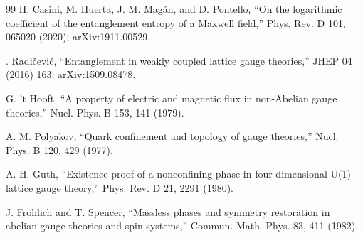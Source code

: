 \documentclass[11pt]{article}
\theoremstyle{remark}
\theoremstyle{plain}
\begin{document}
\begin{thebibliography}{99}
 H. Casini, M. Huerta, J. M. Mag\'an, and D. Pontello, ``On the logarithmic coefficient of the entanglement entropy of a Maxwell field,'' Phys. Rev. D 101, 065020 (2020); arXiv:1911.00529.

 \DJ. Radi\v{c}evi\'c, ``Entanglement in weakly coupled lattice gauge theories,'' JHEP 04 (2016) 163; arXiv:1509.08478.

 G. 't Hooft, ``A property of electric and magnetic flux in non-Abelian gauge theories,'' Nucl. Phys. B 153, 141 (1979).

 A. M. Polyakov, ``Quark confinement and topology of gauge theories,'' Nucl. Phys. B 120, 429 (1977).

 A. H. Guth, ``Existence proof of a nonconfining phase in four-dimensional U(1) lattice gauge theory,'' Phys. Rev. D 21, 2291 (1980).

 J. Fr\"ohlich and T. Spencer, ``Massless phases and symmetry restoration in abelian gauge theories and spin systems,'' Commun. Math. Phys. 83, 411 (1982).

\end{thebibliography}
\end{document}
